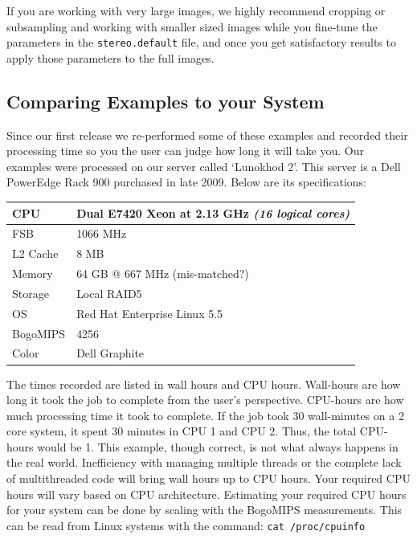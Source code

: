 If you are working with very large images, we highly recommend
cropping or subsampling and working with smaller sized images while
you fine-tune the parameters in the \texttt{stereo.default} file,
and once you get satisfactory results to apply those parameters to
the full images.


\subsection{Comparing Examples to your System}

Since our first release we re-performed some of these examples and
recorded their processing time so you the user can judge how long it
will take you. Our examples were processed on our server called
`Lunokhod 2'. This server is a Dell PowerEdge Rack 900 purchased in
late 2009. Below are its specifications:

\begin{center}
\begin{tabular}{ l | l }
CPU & Dual E7420 Xeon at 2.13 GHz \emph{(16 logical cores)} \\ \hline
FSB & 1066 MHz \\ \hline
L2 Cache & 8 MB \\ \hline
Memory & 64 GB @ 667 MHz (mis-matched?) \\ \hline
Storage & Local RAID5 \\ \hline
OS & Red Hat Enterprise Linux 5.5 \\ \hline
BogoMIPS & 4256 \\ \hline
Color & Dell Graphite \\
\end{tabular}
\end{center}

The times recorded are listed in wall hours and CPU hours. Wall-hours
are how long it took the job to complete from the user's
perspective. CPU-hours are how much processing time it took to
complete. If the job took 30 wall-minutes on a 2 core system, it spent
30 minutes in CPU 1 and CPU 2. Thus, the total CPU-hours would be
1. This example, though correct, is not what always happens in the
real world. Inefficiency with managing multiple threads or the
complete lack of multithreaded code will bring wall hours up to CPU
hours. Your required CPU hours will vary based on CPU
architecture. Estimating your required CPU hours for your system can
be done by scaling with the BogoMIPS measurements. This can be read
from Linux systems with the command: \texttt{cat /proc/cpuinfo}

